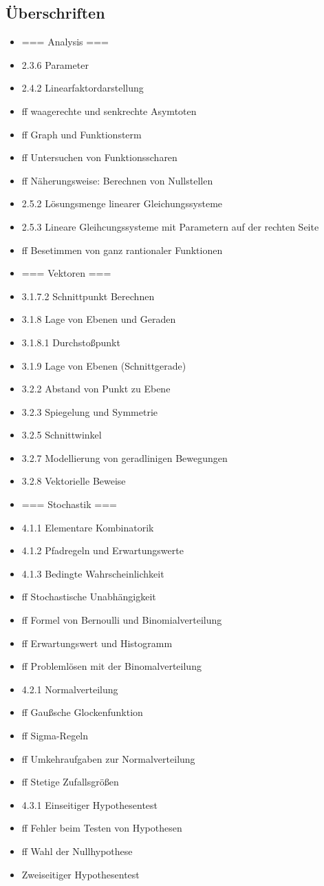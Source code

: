 \subsection{Überschriften}
\begin{itemize}
    \item === Analysis ===
    \item 2.3.6 Parameter
    \item 2.4.2 Linearfaktordarstellung
    \item ff waagerechte und senkrechte Asymtoten
    \item ff Graph und Funktionsterm
    \item ff Untersuchen von Funktionsscharen
    \item ff Näherungsweise: Berechnen von Nullstellen
    \item 2.5.2 Lösungsmenge linearer Gleichungssysteme
    \item 2.5.3 Lineare Gleihcungssysteme mit Parametern auf der rechten Seite
    \item ff Besetimmen von ganz rantionaler Funktionen
    \item === Vektoren ===
    \item 3.1.7.2 Schnittpunkt Berechnen
    \item 3.1.8 Lage von Ebenen und Geraden
    \item 3.1.8.1 Durchstoßpunkt
    \item 3.1.9 Lage von Ebenen (Schnittgerade)
    \item 3.2.2 Abstand von Punkt zu Ebene
    \item 3.2.3 Spiegelung und Symmetrie
    \item 3.2.5 Schnittwinkel
    \item 3.2.7 Modellierung von geradlinigen Bewegungen
    \item 3.2.8 Vektorielle Beweise
    \item === Stochastik ===
    \item 4.1.1 Elementare Kombinatorik
    \item 4.1.2 Pfadregeln und Erwartungswerte
    \item 4.1.3 Bedingte Wahrscheinlichkeit
    \item ff Stochastische Unabhängigkeit
    \item ff Formel von Bernoulli und Binomialverteilung
    \item ff Erwartungswert und Histogramm
    \item ff Problemlösen mit der Binomalverteilung
    \item 4.2.1 Normalverteilung
    \item ff Gaußsche Glockenfunktion
    \item ff Sigma-Regeln
    \item ff Umkehraufgaben zur Normalverteilung
    \item ff Stetige Zufallsgrößen 
    \item 4.3.1 Einseitiger Hypothesentest
    \item ff Fehler beim Testen von Hypothesen
    \item ff Wahl der Nullhypothese
    \item Zweiseitiger Hypothesentest
\end{itemize}

